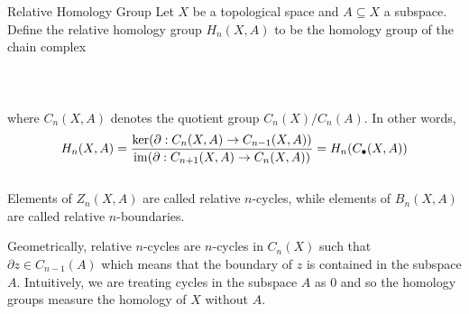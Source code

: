 \documentclass[a4paper]{article}
\begin{document}
\begin{defn}{Relative Homology Group}{} Let $X$ be a topological space and $A\subseteq X$ a subspace. Define the relative homology group $H_n(X,A)$ to be the homology group of the chain complex \\~\\
\\~\\
where $C_n(X,A)$ denotes the quotient group $C_n(X)/C_n(A)$. In other words, $$H_n(X,A)=\frac{\ker(\partial:C_n(X,A)\to C_{n-1}(X,A))}{\operatorname{im}(\partial:C_{n+1}(X,A)\to C_n(X,A))}=H_n(C_\bullet(X,A))$$~\\
Elements of $Z_n(X,A)$ are called relative $n$-cycles, while elements of $B_n(X,A)$ are called relative $n$-boundaries. 
\end{defn}

Geometrically, relative $n$-cycles are $n$-cycles in $C_n(X)$ such that $\partial z\in C_{n-1}(A)$ which means that the boundary of $z$ is contained in the subspace $A$. Intuitively, we are treating cycles in the subspace $A$ as $0$ and so the homology groups measure the homology of $X$ without $A$. 
\end{document}
